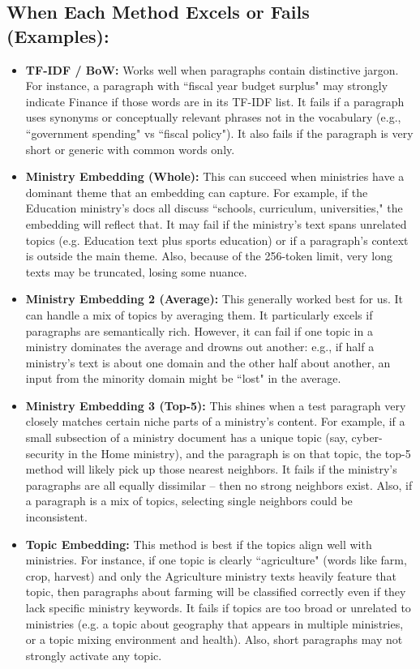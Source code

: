 \documentclass{report}
\begin{document}
\subsection{When Each Method Excels or Fails (Examples):}
\begin{itemize}
    \item \textbf{TF-IDF / BoW:} Works well when paragraphs contain distinctive jargon. For instance, a paragraph with ``fiscal year budget surplus" may strongly indicate Finance if those words are in its TF-IDF list. It fails if a paragraph uses synonyms or conceptually relevant phrases not in the vocabulary (e.g., ``government spending" vs ``fiscal policy"). It also fails if the paragraph is very short or generic with common words only.
    \item \textbf{Ministry Embedding (Whole):} This can succeed when ministries have a dominant theme that an embedding can capture. For example, if the Education ministry's docs all discuss ``schools, curriculum, universities," the embedding will reflect that. It may fail if the ministry's text spans unrelated topics (e.g. Education text plus sports education) or if a paragraph's context is outside the main theme. Also, because of the 256-token limit, very long texts may be truncated, losing some nuance.
    \item \textbf{Ministry Embedding 2 (Average):} This generally worked best for us. It can handle a mix of topics by averaging them. It particularly excels if paragraphs are semantically rich. However, it can fail if one topic in a ministry dominates the average and drowns out another: e.g., if half a ministry's text is about one domain and the other half about another, an input from the minority domain might be ``lost" in the average.
    \item \textbf{Ministry Embedding 3 (Top-5):} This shines when a test paragraph very closely matches certain niche parts of a ministry's content. For example, if a small subsection of a ministry document has a unique topic (say, cyber-security in the Home ministry), and the paragraph is on that topic, the top-5 method will likely pick up those nearest neighbors. It fails if the ministry's paragraphs are all equally dissimilar – then no strong neighbors exist. Also, if a paragraph is a mix of topics, selecting single neighbors could be inconsistent.
    \item \textbf{Topic Embedding:} This method is best if the topics align well with ministries. For instance, if one topic is clearly ``agriculture" (words like farm, crop, harvest) and only the Agriculture ministry texts heavily feature that topic, then paragraphs about farming will be classified correctly even if they lack specific ministry keywords. It fails if topics are too broad or unrelated to ministries (e.g. a topic about geography that appears in multiple ministries, or a topic mixing environment and health). Also, short paragraphs may not strongly activate any topic.

\end{itemize}
\end{document}
